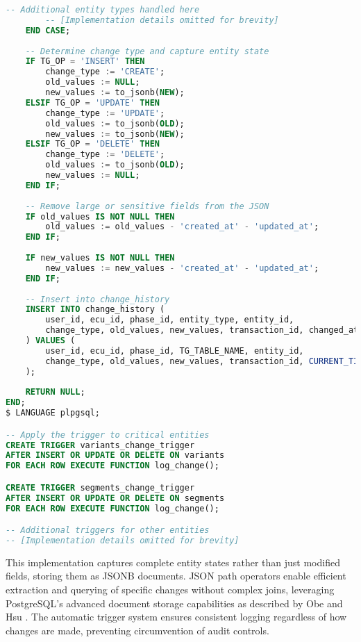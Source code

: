 \begin{lstlisting}[language=SQL, caption={Change Tracking Trigger}, label={lst:change-tracking-trigger}]
        -- Additional entity types handled here
        -- [Implementation details omitted for brevity]
    END CASE;
    
    -- Determine change type and capture entity state
    IF TG_OP = 'INSERT' THEN
        change_type := 'CREATE';
        old_values := NULL;
        new_values := to_jsonb(NEW);
    ELSIF TG_OP = 'UPDATE' THEN
        change_type := 'UPDATE';
        old_values := to_jsonb(OLD);
        new_values := to_jsonb(NEW);
    ELSIF TG_OP = 'DELETE' THEN
        change_type := 'DELETE';
        old_values := to_jsonb(OLD);
        new_values := NULL;
    END IF;
    
    -- Remove large or sensitive fields from the JSON
    IF old_values IS NOT NULL THEN
        old_values := old_values - 'created_at' - 'updated_at';
    END IF;
    
    IF new_values IS NOT NULL THEN
        new_values := new_values - 'created_at' - 'updated_at';
    END IF;
    
    -- Insert into change_history
    INSERT INTO change_history (
        user_id, ecu_id, phase_id, entity_type, entity_id,
        change_type, old_values, new_values, transaction_id, changed_at
    ) VALUES (
        user_id, ecu_id, phase_id, TG_TABLE_NAME, entity_id,
        change_type, old_values, new_values, transaction_id, CURRENT_TIMESTAMP
    );
    
    RETURN NULL;
END;
$ LANGUAGE plpgsql;

-- Apply the trigger to critical entities
CREATE TRIGGER variants_change_trigger
AFTER INSERT OR UPDATE OR DELETE ON variants
FOR EACH ROW EXECUTE FUNCTION log_change();

CREATE TRIGGER segments_change_trigger
AFTER INSERT OR UPDATE OR DELETE ON segments
FOR EACH ROW EXECUTE FUNCTION log_change();

-- Additional triggers for other entities
-- [Implementation details omitted for brevity]
\end{lstlisting}

This implementation captures complete entity states rather than just modified fields, storing them as JSONB documents. JSON path operators enable efficient extraction and querying of specific changes without complex joins, leveraging PostgreSQL's advanced document storage capabilities as described by Obe and Hsu \cite{obe2017postgresql}. The automatic trigger system ensures consistent logging regardless of how changes are made, preventing circumvention of audit controls.

